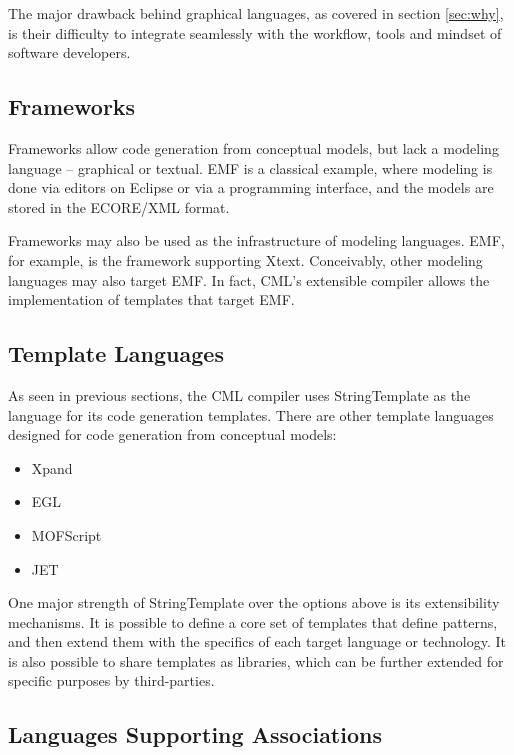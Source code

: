 The major drawback behind graphical languages,
as covered in section \ref{sec:why},
is their difficulty to integrate seamlessly with the workflow, tools and mindset of software developers.

\subsection{Frameworks}

Frameworks allow code generation from conceptual models, but lack a modeling language -- graphical or textual. 
EMF is a classical example,
where modeling is done via editors on Eclipse or via a programming interface,
and the models are stored in the ECORE/XML format. 

Frameworks may also be used as the infrastructure of modeling languages.
EMF, for example, is the framework supporting Xtext.
Conceivably, other modeling languages may also target EMF.
In fact, CML's extensible compiler allows the implementation of templates that target EMF.

\subsection{Template Languages}

As seen in previous sections,
the CML compiler uses StringTemplate as the language for its code generation templates.
There are other template languages designed for code generation from conceptual models:

\begin{itemize}
\item Xpand \cite{xpand}
\item EGL \cite{egl}
\item MOFScript \cite{mofscript}
\item JET \cite{jet}
\end{itemize}

One major strength of StringTemplate over the options above is its extensibility mechanisms.
It is possible to define a core set of templates that define patterns, 
and then extend them with the specifics of each target language or technology.
It is also possible to share templates as libraries,
which can be further extended for specific purposes by third-parties.

\subsection{Languages Supporting Associations}

